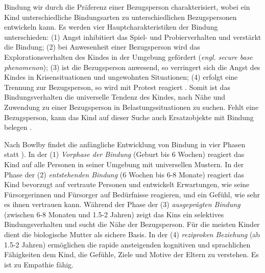 Bindung wir durch die Präferenz einer Bezugsperson charakterisiert, wobei ein Kind unterschiedliche Bindungsarten zu unterschiedlichen Bezugspersonen entwickeln kann. Es werden vier Hauptcharakteristiken der Bindung unterschieden: (1) Angst inhibitiert das Spiel- und Probierverhalten und verstärkt die Bindung; (2) bei Anwesenheit einer Bezugsperson wird das Explorationsverhalten des Kindes in der Umgebung gefördert (\textit{engl. secure base phenomenon}); (3) ist die Bezugsperson anwesend, so verringert sich die Angst des Kindes in Krisensituationen und ungewohnten Situationen; (4) erfolgt eine Trennung zur Bezugsperson, so wird mit Protest reagiert \cite{Resch1999}. Somit ist das Bindungsverhalten die universelle Tendenz des Kindes, nach Nähe und Zuwendung zu einer Bezugsperson in Belastungssituationen zu suchen. Fehlt eine Bezugsperson, kann das Kind auf dieser Suche auch Ersatzobjekte mit Bindung belegen \cite{Resch1999}.

Nach Bowlby findet die anfängliche Entwicklung von Bindung in vier Phasen statt \cite{Siegler2008}). In der (1) \textit{Vorphase der Bindung} (Geburt bis 6 Wochen) reagiert das Kind auf alle Personen in seiner Umgebung mit universellen Mustern. In der Phase der (2) \textit{entstehenden Bindung} (6 Wochen bis 6-8 Monate) reagiert das Kind bevorzugt auf vertraute Personen und entwickelt Erwartungen, wie seine Fürsorgerinnen und Fürsorger auf Bedürfnisse reagieren, und ein Gefühl, wie sehr es ihnen vertrauen kann. Während der Phase der (3) \textit{ausgeprägten Bindung} (zwischen 6-8 Monaten und 1.5-2 Jahren) zeigt das Kins ein selektives Bindungsverhalten und sucht die Nähe der Bezugsperson. Für die meisten Kinder dient die biologische Mutter als sichere Basis. In der (4) \textit{reziproken Beziehung} (ab 1.5-2 Jahren) ermöglichen die rapide ansteigenden kognitiven und sprachlichen Fähigkeiten dem Kind, die Gefühle, Ziele und Motive der Eltern zu verstehen. Es ist zu Empathie fähig.

